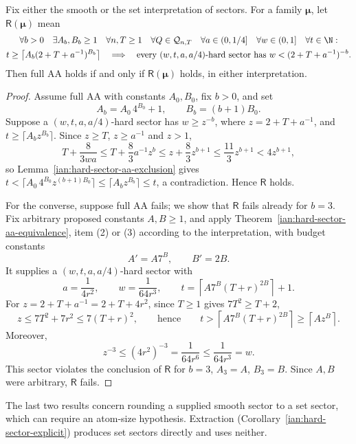 \begin{corollary}
\label{ian:hard-sector-resource-equivalence}
Fix either the smooth or the set interpretation of sectors. For a family
\(\symbf{\mu}\), let \(\mathsf R(\symbf{\mu})\) mean
\[
 \begin{gathered}
 \forall b>0\quad\exists A_b,B_b\ge1\quad
 \forall n,T\ge1\quad\forall Q\in\mathcal Q_{n,T}\quad
 \forall a\in(0,1/4]\quad\forall w\in(0,1]\quad
 \forall t\in\N:\\
 t\ge\left\lceil A_b(2+T+a^{-1})^{B_b}\right\rceil
 \quad\Longrightarrow\quad
 \text{every }(w,t,a,a/4)\text{-hard sector has }
 w<(2+T+a^{-1})^{-b}.
 \end{gathered}
\]
Then full AA holds if and only if
\(\mathsf R(\symbf{\mu})\) holds, in either interpretation.
\end{corollary}

\begin{proof}
Assume full AA with constants \(A_0,B_0\), fix \(b>0\), and set
\[
 A_b=A_0\,4^{B_0}+1,\qquad B_b=(b+1)B_0.
\]
Suppose a \((w,t,a,a/4)\)-hard sector has \(w\ge z^{-b}\), where
\(z=2+T+a^{-1}\), and \(t\ge\lceil A_bz^{B_b}\rceil\). Since \(z\ge T\),
\(z\ge a^{-1}\) and \(z>1\),
\[
 T+\frac8{3wa}
 \le T+\frac83a^{-1}z^b
 \le z+\frac83z^{b+1}
 \le\frac{11}{3}z^{b+1}<4z^{b+1},
\]
so Lemma~\ref{ian:hard-sector-aa-exclusion} gives
\(t<\lceil A_0\,4^{B_0}z^{(b+1)B_0}\rceil\le\lceil A_bz^{B_b}\rceil\le t\),
a contradiction. Hence \(\mathsf R\) holds.

For the converse, suppose full AA fails; we show that \(\mathsf R\) fails
already for \(b=3\). Fix arbitrary proposed constants \(A,B\ge1\), and
apply Theorem~\ref{ian:hard-sector-aa-equivalence}, item (2) or (3)
according to the interpretation, with budget constants
\[
 A'=A7^B,\qquad B'=2B.
\]
It supplies a \((w,t,a,a/4)\)-hard sector with
\[
 a=\frac1{4r^2},\qquad w=\frac1{64r^3},\qquad
 t=\left\lceil A7^B(T+r)^{2B}\right\rceil+1.
\]
For \(z=2+T+a^{-1}=2+T+4r^2\), since \(T\ge1\) gives \(7T^2\ge T+2\),
\[
 z\le7T^2+7r^2\le7(T+r)^2,
 \qquad\text{hence}\qquad
 t>\left\lceil A7^B(T+r)^{2B}\right\rceil\ge\left\lceil Az^B\right\rceil.
\]
Moreover,
\[
 z^{-3}\le(4r^2)^{-3}
 =\frac1{64r^6}\le\frac1{64r^3}=w.
\]
This sector violates the conclusion of \(\mathsf R\) for \(b=3\),
\(A_3=A\), \(B_3=B\). Since \(A,B\) were arbitrary, \(\mathsf R\) fails.
\end{proof}

The last two results concern rounding a supplied smooth sector to a set
sector, which can require an atom-size hypothesis. Extraction
(Corollary~\ref{ian:hard-sector-explicit}) produces set sectors directly
and uses neither.

